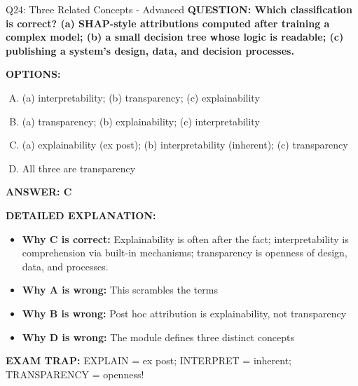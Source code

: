 \documentclass[8pt]{beamer}
\begin{document}
\begin{frame}[shrink=6]{Q24: Three Related Concepts - Advanced}
\fontsize{6.5}{7.5}\selectfont
\textbf{QUESTION: Which classification is correct? (a) SHAP-style attributions computed after training a complex model; (b) a small decision tree whose logic is readable; (c) publishing a system's design, data, and decision processes.}

\vspace{0.1cm}
\textbf{OPTIONS:}
\begin{enumerate}[A.]
\item (a) interpretability; (b) transparency; (c) explainability
\item (a) transparency; (b) explainability; (c) interpretability
\item (a) explainability (ex post); (b) interpretability (inherent); (c) transparency
\item All three are transparency
\end{enumerate}

\vspace{0.1cm}
\textcolor{myblue}{\textbf{ANSWER: C}}

\vspace{0.1cm}
\textbf{DETAILED EXPLANATION:}
\begin{itemize}
\item \textbf{Why C is correct:} Explainability is often after the fact; interpretability is comprehension via built-in mechanisms; transparency is openness of design, data, and processes.
\item \textbf{Why A is wrong:} This scrambles the terms
\item \textbf{Why B is wrong:} Post hoc attribution is explainability, not transparency
\item \textbf{Why D is wrong:} The module defines three distinct concepts
\end{itemize}

\textcolor{myred}{\textbf{EXAM TRAP:}} EXPLAIN = ex post; INTERPRET = inherent; TRANSPARENCY = openness!
\end{frame}
\end{document}
